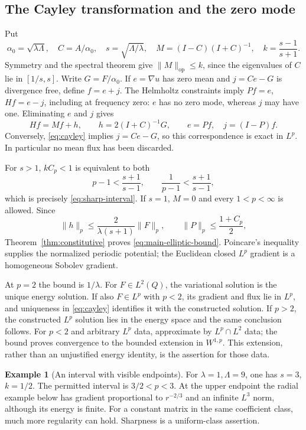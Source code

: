 \documentclass[11pt,a4paper]{article}
\numberwithin{equation}{section}
\theoremstyle{definition}
\newtheorem{example}[theorem]{Example}
\theoremstyle{remark}\newtheorem{remark}[theorem]{Remark}
\newcommand{\Id}{I}
\newcommand{\norm}[1]{\lVert #1\rVert}
\newcommand{\op}{\mathrm{op}}
\begin{document}
\subsection{The Cayley transformation and the zero mode}

Put
\[
 \alpha_0=\sqrt{\lambda\Lambda},\quad C=A/\alpha_0,\quad
 s=\sqrt{\Lambda/\lambda},\quad
 M=(\Id-C)(\Id+C)^{-1},\quad k=\frac{s-1}{s+1}.
\]
Symmetry and the spectral theorem give
\(\norm M_{\op}\leq k\), since the eigenvalues of \(C\) lie in
\([1/s,s]\).
Write \(G=F/\alpha_0\). If \(e=\nabla u\) has zero mean and
\(j=Ce-G\) is divergence free, define \(f=e+j\).
The Helmholtz constraints imply \(Pf=e\), \(Hf=e-j\), including at
frequency zero: \(e\) has no zero mode, whereas \(j\) may have one.
Eliminating \(e\) and \(j\) gives
\begin{equation}\label{eq:cayley}
 Hf=Mf+h,\qquad
 h=2(\Id+C)^{-1}G,\qquad e=Pf,\quad j=(\Id-P)f.
\end{equation}
Conversely, \eqref{eq:cayley} implies
\(j=Ce-G\), so this correspondence is exact in \(L^p\).
In particular no mean flux has been discarded.

For \(s>1\), \(kC_p<1\) is equivalent to both
\[
 p-1<\frac{s+1}{s-1},\qquad
 \frac1{p-1}<\frac{s+1}{s-1},
\]
which is precisely \eqref{eq:sharp-interval}. If \(s=1\), \(M=0\)
and every \(1<p<\infty\) is allowed.
Since
\[
 \norm h_p\leq\frac{2}{\lambda(s+1)}\norm F_p,\qquad
 \norm P_p\leq\frac{1+C_p}{2},
\]
Theorem~\ref{thm:constitutive} proves \eqref{eq:main-elliptic-bound}.
Poincare's inequality supplies the normalized periodic potential;
the Euclidean closed \(L^p\) gradient is a homogeneous Sobolev gradient.

At \(p=2\) the bound is \(1/\lambda\). For \(F\in L^2(Q)\), the
variational solution is the unique energy solution. If also \(F\in L^p\)
with \(p<2\), its gradient and flux lie in \(L^p\), and uniqueness in
\eqref{eq:cayley} identifies it with the constructed solution.
If \(p>2\), the constructed \(L^p\) solution lies in the energy space
and the same conclusion follows. For \(p<2\) and arbitrary \(L^p\)
data, approximate by \(L^p\cap L^2\) data; the bound proves convergence
to the bounded extension in \(W^{1,p}\). This extension, rather than an
unjustified energy identity, is the assertion for those data.

\begin{example}[An interval with visible endpoints]
For \(\lambda=1,\Lambda=9\), one has \(s=3\), \(k=1/2\).
The permitted interval is \(3/2<p<3\). At the upper endpoint the
radial example below has gradient proportional to \(r^{-2/3}\)
and an infinite \(L^3\) norm, although its energy is finite.
For a constant matrix in the same coefficient class, much more regularity
can hold. Sharpness is a uniform-class assertion.
\end{example}
\end{document}
